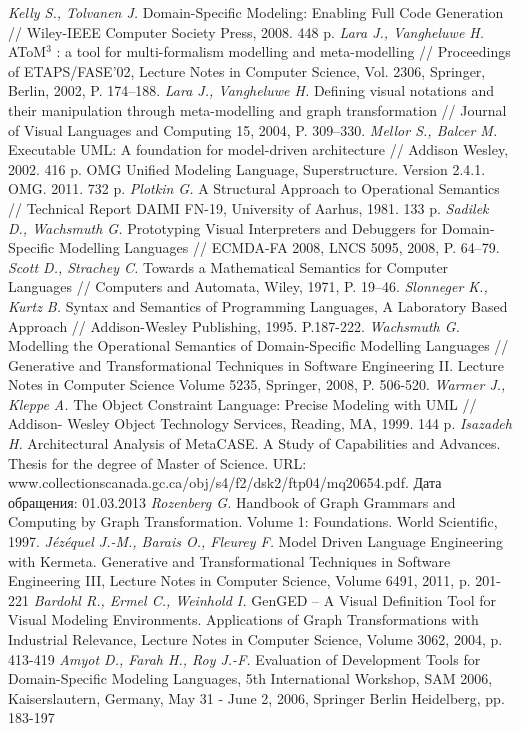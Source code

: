 \documentclass[a5paper]{article}
\begin{document}
\begin{thebibliography}{9001}
 \emph{Kelly S., Tolvanen J.} Domain-Specific Modeling: Enabling Full Code Generation // Wiley-IEEE Computer Society Press, 2008. 448 p.
 \emph{Lara J., Vangheluwe H.} AToM$^3$ : a tool for multi-formalism modelling and meta-modelling // Proceedings of ETAPS/FASE’02, Lecture Notes in Computer Science, Vol. 2306, Springer, Berlin, 2002, P. 174–188.
 \emph{Lara J., Vangheluwe H.} Defining visual notations and their manipulation through meta-modelling and graph transformation // Journal of Visual Languages and Computing 15, 2004, P. 309–330.
 \emph{Mellor S., Balcer M.} Executable UML: A foundation for model-driven architecture // Addison Wesley, 2002. 416 p.
 \emph{} OMG Unified Modeling Language, Superstructure. Version 2.4.1. OMG. 2011. 732 p.
 \emph{Plotkin G.} A Structural Approach to Operational Semantics // Technical Report DAIMI FN-19, University of Aarhus, 1981. 133 p.
 \emph{Sadilek D., Wachsmuth G.} Prototyping Visual Interpreters and Debuggers for Domain-Specific Modelling Languages // ECMDA-FA 2008, LNCS 5095, 2008, P. 64–79.
 \emph{Scott D., Strachey C.} Towards a Mathematical Semantics for Computer Languages // Computers and Automata, Wiley, 1971, P. 19–46.
 \emph{Slonneger K., Kurtz B.} Syntax and Semantics of Programming Languages, A Laboratory Based Approach // Addison-Wesley Publishing, 1995. P.187-222.
 \emph{Wachsmuth G.} Modelling the Operational Semantics of Domain-Specific Modelling Languages // Generative and Transformational Techniques in Software Engineering II. Lecture Notes in Computer Science Volume 5235, Springer, 2008, P. 506-520.
 \emph{Warmer J., Kleppe A.} The Object Constraint Language: Precise Modeling with UML // Addison- Wesley Object Technology Services, Reading, MA, 1999. 144 p.
 \emph{Isazadeh H.} Architectural Analysis of MetaCASE. A Study of Capabilities and Advances. Thesis for the degree of Master of Science. URL: www.collectionscanada.gc.ca/obj/s4/f2/dsk2/ftp04/mq20654.pdf. Дата обращения: 01.03.2013 
 \emph{Rozenberg G.} Handbook of Graph Grammars and Computing by Graph Transformation. Volume 1: Foundations. World Scientific, 1997.
 \emph{Jézéquel J.-M., Barais O., Fleurey F.} Model Driven Language Engineering with Kermeta. Generative and Transformational Techniques in Software Engineering III, Lecture Notes in Computer Science, Volume 6491, 2011, p. 201-221
 \emph{Bardohl R., Ermel C., Weinhold I.} GenGED – A Visual Definition Tool for Visual Modeling Environments. Applications of Graph Transformations with Industrial Relevance, Lecture Notes in Computer Science, Volume 3062, 2004, p. 413-419
 \emph{Amyot D., Farah H., Roy J.-F.} Evaluation of Development Tools for Domain-Specific Modeling Languages, 5th International Workshop, SAM 2006, Kaiserslautern, Germany, May 31 - June 2, 2006, Springer Berlin Heidelberg, pp. 183-197
\end{thebibliography}
\end{document}
